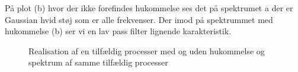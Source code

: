  På plot (b) hvor der ikke forefindes hukommelse ses det på spektrumet a der er Gaussian hvid støj som er alle frekvenser. Der imod på spektrummet med hukommelse (b) ser vi en lav pass filter lignende karakteristik.  
 \begin{figure}[!h]
	\centering
	\caption{Realisation af en tilfældig processer med og uden hukommelse og spektrum af samme tilfældig processer  }
	\label{fig:part2_markov}
\end{figure}

